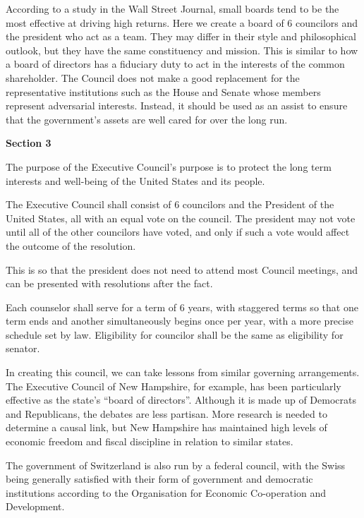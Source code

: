 \documentclass{article}
\newcommand{\quotes}[1]{``#1''}
\begin{document}
According to a study in the Wall Street Journal, small boards tend to be the most effective at driving high returns\cite{Lublin}. Here we create a board of 6 councilors and the president who act as a team. They may differ in their style and philosophical outlook, but they have the same constituency and mission. This is similar to how a board of directors has a fiduciary duty to act in the interests of the common shareholder. The Council does not make a good replacement for the representative institutions such as the House and Senate whose members represent adversarial interests. Instead, it should be used as an assist to ensure that the government's assets are well cared for over the long run.

\begin{quoting}
\textbf{Section 3}

The purpose of the Executive Council’s purpose is to protect the long term interests and well-being of the United States and its people.

The Executive Council shall consist of 6 councilors and the President of the United States, all with an equal vote on the council. The president may not vote until all of the other councilors have voted, and only if such a vote would affect the outcome of the resolution.
\end{quoting}

This is so that the president does not need to attend most Council meetings, and can be presented with resolutions after the fact.

\begin{quoting}
Each counselor shall serve for a term of 6 years, with staggered terms so that one term ends and another simultaneously begins once per year, with a more precise schedule set by law. Eligibility for councilor shall be the same as eligibility for senator.
\end{quoting}

In creating this council, we can take lessons from similar governing arrangements\cite{Khanna}. The Executive Council of New Hampshire, for example, has been particularly effective as the state's \quotes{board of directors}\cite{Hahn-Burkett}. Although it is made up of Democrats and Republicans, the debates are less partisan\cite{Timmins}. More research is needed to determine a causal link, but New Hampshire has maintained high levels of economic freedom and fiscal discipline in relation to similar states\cite{Ruger}.

The government of Switzerland is also run by a federal council, with the Swiss being generally satisfied with their form of government and democratic institutions according to the Organisation for Economic Co-operation and Development\cite{Kaufman}.
\end{document}
